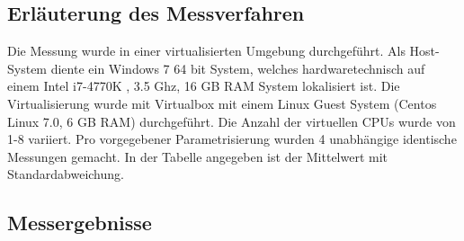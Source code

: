 \documentclass[10pt,a4paper]{report}
\begin{document}
\subsection{Erläuterung des Messverfahren}

Die Messung wurde in einer virtualisierten Umgebung durchgeführt. Als Host-System diente ein Windows 7 64 bit System, welches hardwaretechnisch auf einem Intel i7-4770K , 3.5 Ghz, 16 GB RAM System lokalisiert ist. Die Virtualisierung wurde mit Virtualbox mit einem Linux Guest System (Centos Linux 7.0, 6 GB RAM) durchgeführt. 
Die Anzahl der virtuellen CPUs wurde von 1-8 variiert.
Pro vorgegebener Parametrisierung wurden 4 unabhängige identische Messungen gemacht. In der Tabelle angegeben ist der Mittelwert mit Standardabweichung.
 

\subsection{Messergebnisse}
\end{document}
